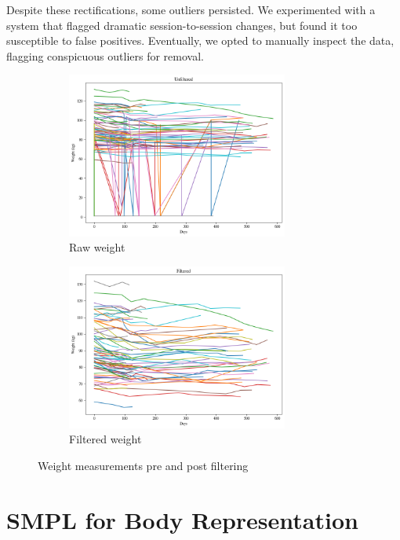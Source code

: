 Despite these rectifications, some outliers persisted. We experimented with a
system that flagged dramatic session-to-session changes, but found it too
susceptible to false positives. Eventually, we opted to manually inspect the
data, flagging conspicuous outliers for removal.

\begin{figure}[h]
    \centering
    \begin{subfigure}{\textwidth}
        \centering
        \includegraphics[width=0.8\textwidth]{files/weight_unfiltered}
        \caption{Raw weight}
    \end{subfigure}
    \begin{subfigure}{\textwidth}
        \centering
        \includegraphics[width=0.8\textwidth]{files/weight_filtered}
        \caption{Filtered weight}
    \end{subfigure}
    \caption{Weight measurements pre and post filtering}
\end{figure}
\section{SMPL for Body Representation}

